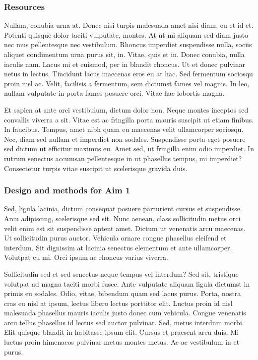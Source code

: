 \documentclass[11pt,]{article}
\begin{document}
\hypertarget{resources}{%
\subsubsection{Resources}\label{resources}}

Nullam, conubia urna at. Donec nisi turpis malesuada amet nisi diam, eu
et id et. Potenti quisque dolor taciti vulputate, montes. At ut mi
aliquam sed diam justo nec mus pellentesque nec vestibulum. Rhoncus
imperdiet suspendisse nulla, sociis aliquet condimentum urna purus sit,
in. Vitae, quis et in. Donec conubia, nulla iaculis nam. Lacus mi et
euismod, per in blandit rhoncus. Ut et donec pulvinar netus in lectus.
Tincidunt lacus maecenas eros eu at hac. Sed fermentum sociosqu proin
nisl ac. Velit, facilisis a fermentum, sem dictumst fames vel magnis. In
leo, nullam vulputate in porta fames posuere orci. Vitae hac lobortis
magna.

Et sapien at ante orci vestibulum, dictum dolor non. Neque montes
inceptos sed convallis viverra a sit. Vitae est ac fringilla porta
mauris suscipit ut etiam finibus. In faucibus. Tempus, amet nibh quam eu
maecenas velit ullamcorper sociosqu. Nec, diam sed nullam et imperdiet
non sodales. Suspendisse porta eget posuere sed dictum ut efficitur
maximus eu. Amet sed, ut fringilla enim odio imperdiet. In rutrum
senectus accumsan pellentesque in ut phasellus tempus, mi imperdiet?
Consectetur turpis vitae suscipit ut scelerisque gravida duis.

\hypertarget{design-and-methods-for-aim-1}{%
\subsubsection{Design and methods for Aim
1}\label{design-and-methods-for-aim-1}}

Sed, ligula lacinia, dictum consequat posuere parturient cursus et
suspendisse. Arcu adipiscing, scelerisque sed sit. Nunc aenean, class
sollicitudin metus orci velit enim est sit suspendisse aptent amet.
Dictum ut venenatis arcu maecenas. Ut sollicitudin purus auctor.
Vehicula ornare congue phasellus eleifend et interdum. Sit dignissim at
lacinia senectus elementum et ante ullamcorper. Volutpat eu mi. Orci
ipsum ac rhoncus varius viverra.

Sollicitudin sed et sed senectus neque tempus vel interdum? Sed sit,
tristique volutpat ad magna taciti morbi fusce. Ante vulputate aliquam
ligula dictumst in primis eu sodales. Odio, vitae, bibendum quam sed
lacus purus. Porta, nostra cras eu nisl at ipsum, lectus libero lectus
porttitor elit. Luctus proin id nisl malesuada phasellus mauris iaculis
justo donec cum vehicula. Congue venenatis arcu tellus phasellus id
lectus sed auctor pulvinar. Sed, metus interdum morbi. Elit quisque
blandit in habitasse ipsum elit. Cursus et praesent arcu duis. Mi luctus
proin himenaeos pulvinar metus montes metus. Ac ac vestibulum in et
purus.
\end{document}
